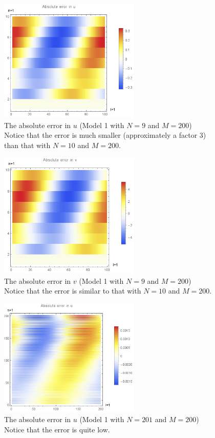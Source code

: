 \documentclass{article}
\renewcommand{\(}{\left(}
\renewcommand{\)}{\right)}
\begin{document}
\begin{figure}
\centering
\includegraphics[width=0.6\textwidth]{errorUneat9x100.png}
\caption{The absolute error in $u$ (Model 1 with $N=9$ and $M=200$)\\Notice that the error is much smaller (approximately a factor 3) than that with $N=10$ and $M=200$.}
\label{fig:uerr1small}
\end{figure}

\begin{figure}
\centering
\includegraphics[width=0.6\textwidth]{errorVneat9x100.png}
\caption{The absolute error in $v$ (Model 1 with $N=9$ and $M=200$)\\Notice that the error is similar to that with $N=10$ and $M=200$.}
\label{fig:verr1small}
\end{figure}


\begin{figure}
\centering
\includegraphics[width=0.6\textwidth]{errorUneat201x200.png}
\caption{The absolute error in $u$ (Model 1 with $N=201$ and $M=200$)\\Notice that the error is quite low.}
\label{fig:uerr1big}
\end{figure}
\end{document}
